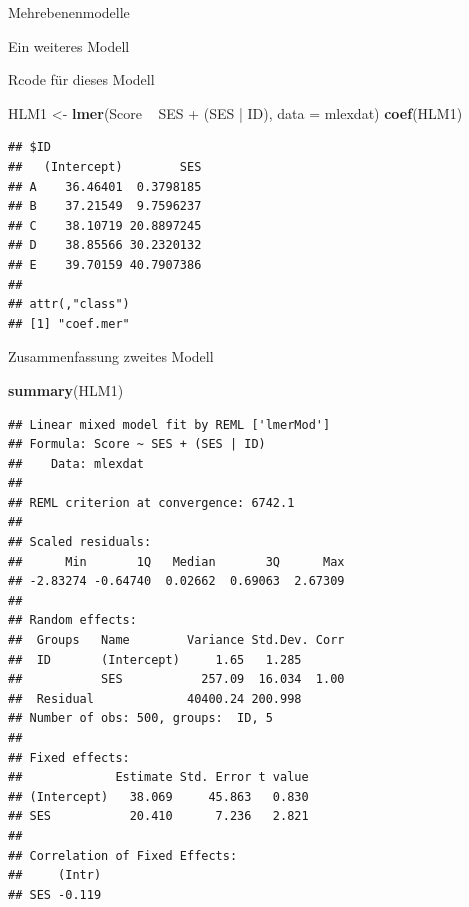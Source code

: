 \documentclass[ignorenonframetext,]{beamer}
\newenvironment{Shaded}{}{}
\newcommand{\KeywordTok}[1]{\textcolor[rgb]{0.00,0.44,0.13}{\textbf{{#1}}}}
\newcommand{\DataTypeTok}[1]{\textcolor[rgb]{0.56,0.13,0.00}{{#1}}}
\newcommand{\StringTok}[1]{\textcolor[rgb]{0.25,0.44,0.63}{{#1}}}
\newcommand{\NormalTok}[1]{{#1}}
\begin{document}
\begin{frame}[fragile]{Mehrebenenmodelle}
\begin{block}{Ein weiteres Modell}
\end{block}

\begin{block}{Rcode für dieses Modell}

\begin{Shaded}
\begin{Highlighting}[]
\NormalTok{HLM1 <-}\StringTok{ }\KeywordTok{lmer}\NormalTok{(Score ~}\StringTok{ }\NormalTok{SES +}\StringTok{ }\NormalTok{(SES |}\StringTok{ }\NormalTok{ID), }\DataTypeTok{data =} \NormalTok{mlexdat)}
\KeywordTok{coef}\NormalTok{(HLM1)}
\end{Highlighting}
\end{Shaded}

\begin{verbatim}
## $ID
##   (Intercept)        SES
## A    36.46401  0.3798185
## B    37.21549  9.7596237
## C    38.10719 20.8897245
## D    38.85566 30.2320132
## E    39.70159 40.7907386
## 
## attr(,"class")
## [1] "coef.mer"
\end{verbatim}

\end{block}

\begin{block}{Zusammenfassung zweites Modell}

\begin{Shaded}
\begin{Highlighting}[]
\KeywordTok{summary}\NormalTok{(HLM1)}
\end{Highlighting}
\end{Shaded}

\begin{verbatim}
## Linear mixed model fit by REML ['lmerMod']
## Formula: Score ~ SES + (SES | ID)
##    Data: mlexdat
## 
## REML criterion at convergence: 6742.1
## 
## Scaled residuals: 
##      Min       1Q   Median       3Q      Max 
## -2.83274 -0.64740  0.02662  0.69063  2.67309 
## 
## Random effects:
##  Groups   Name        Variance Std.Dev. Corr
##  ID       (Intercept)     1.65   1.285      
##           SES           257.09  16.034  1.00
##  Residual             40400.24 200.998      
## Number of obs: 500, groups:  ID, 5
## 
## Fixed effects:
##             Estimate Std. Error t value
## (Intercept)   38.069     45.863   0.830
## SES           20.410      7.236   2.821
## 
## Correlation of Fixed Effects:
##     (Intr)
## SES -0.119
\end{verbatim}

\end{block}


\end{frame}
\end{document}
